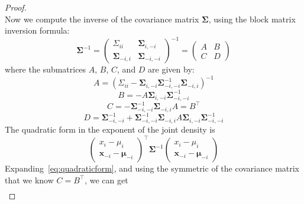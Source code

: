 \begin{proof}
\begin{equation*}
    \end{equation*}
    Now we compute the inverse of the covariance matrix $\boldsymbol{\Sigma}$, using the block matrix inversion formula: 
    \begin{equation*}
        \boldsymbol{\Sigma}^{-1} = \begin{pmatrix} \Sigma_{ii} & \boldsymbol{\Sigma}_{i,-i} \\ \boldsymbol{\Sigma}_{-i,i} & \boldsymbol{\Sigma}_{-i,-i} \end{pmatrix}^{-1} = \begin{pmatrix} A & B \\ C & D \end{pmatrix}
    \end{equation*}
    where the submatrices $A$, $B$, $C$, and $D$ are given by:
    \begin{equation}
        A = (\Sigma_{ii} - \boldsymbol{\Sigma}_{i,-i} \boldsymbol{\Sigma}_{-i,-i}^{-1} \boldsymbol{\Sigma}_{-i,i})^{-1}
    \end{equation}
    \begin{equation}\label{eq:B}
        B = -A \boldsymbol{\Sigma}_{i,-i} \boldsymbol{\Sigma}_{-i,-i}^{-1}
    \end{equation}
    \begin{equation}
        C = -\boldsymbol{\Sigma}_{-i,-i}^{-1} \boldsymbol{\Sigma}_{-i,i} A = B^{\top}
    \end{equation}
    \begin{equation}
        D = \boldsymbol{\Sigma}_{-i,-i}^{-1} + \boldsymbol{\Sigma}_{-i,-i}^{-1} \boldsymbol{\Sigma}_{-i,i} A \boldsymbol{\Sigma}_{i,-i} \boldsymbol{\Sigma}_{-i,-i}^{-1}
    \end{equation}  
    The quadratic form in the exponent of the joint density is
    \begin{equation}\label{eq:quadraticform}
        \begin{pmatrix} x_i - \mu_i \\ \mathbf{x}_{-i} - \boldsymbol{\mu}_{-i} \end{pmatrix}^{\top} \boldsymbol{\Sigma}^{-1} \begin{pmatrix} x_i - \mu_i \\ \mathbf{x}_{-i} - \boldsymbol{\mu}_{-i} \end{pmatrix}
    \end{equation}
    Expanding~\ref{eq:quadraticform}, and using the symmetric of the covariance matrix that we know $C=B^{\top}$, we can get 
    \begin{align*}

\end{align*}
\end{proof}
